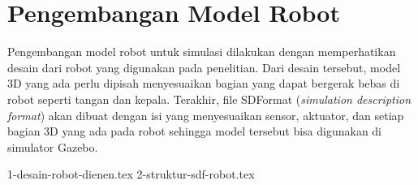 \section{Pengembangan Model Robot}
\label{sec:modelrobot}

Pengembangan model robot untuk simulasi dilakukan dengan memperhatikan desain dari robot yang digunakan pada penelitian.
Dari desain tersebut, model 3D yang ada perlu dipisah menyesuaikan bagian yang dapat bergerak bebas di robot seperti tangan dan kepala.
Terakhir, file SDFormat (\emph{simulation description format}) akan dibuat dengan isi yang menyesuaikan sensor, aktuator, dan setiap bagian 3D yang ada pada robot sehingga model tersebut bisa digunakan di simulator Gazebo.

{1-desain-robot-dienen.tex}
{2-struktur-sdf-robot.tex}
